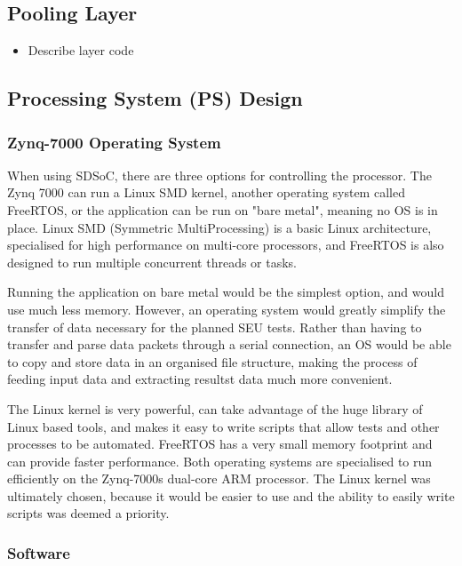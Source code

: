 \documentclass[12pt]{article}
\begin{document}
\subsection{Pooling Layer}
\label{sec:Imp-Pool}


\begin{itemize}
\item Describe layer code
\end{itemize}

\subsection{Processing System (PS) Design}
\label{sec:Design-PS}

\subsubsection{Zynq-7000 Operating System}
\label{sec:Design-PS-OS}

When using SDSoC, there are three options for controlling the processor. The Zynq 7000 can run a Linux SMD kernel, another operating system called FreeRTOS, or the application can be run on "bare metal", meaning no OS is in place. Linux SMD (Symmetric MultiProcessing) is a basic Linux architecture, specialised for high performance on multi-core processors, and FreeRTOS is also designed to run multiple concurrent threads or tasks.

Running the application on bare metal would be the simplest option, and would use much less memory. However, an operating system would greatly simplify the transfer of data necessary for the planned SEU tests. Rather than having to transfer and parse data packets through a serial connection, an OS would be able to copy and store data in an organised file structure, making the process of feeding input data and extracting resultst data much more convenient.

The Linux kernel is very powerful, can take advantage of the huge library of Linux based tools, and makes it easy to write scripts that allow tests and other processes to be automated. FreeRTOS has a very small memory footprint and can provide faster performance. Both operating systems are specialised to run efficiently on the Zynq-7000s dual-core ARM processor. The Linux kernel was ultimately chosen, because it would be easier to use and the ability to easily write scripts was deemed a priority.

\subsubsection{Software}
\label{sec:Design-PS-SW}
\end{document}
